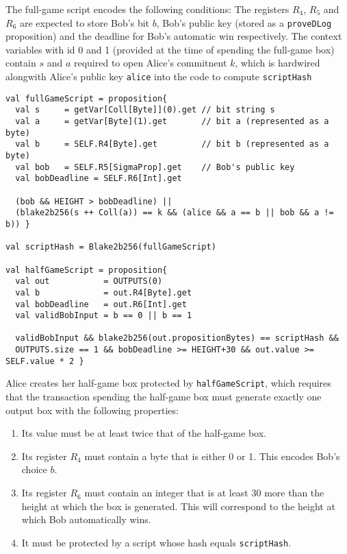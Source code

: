 \documentclass[11pt]{article}
\newcommand{\langname}{ErgoScript\xspace}
\begin{document}
The full-game script encodes the following conditions: The registers $R_4$, $R_5$ and $R_6$ are expected to store Bob's bit $b$, Bob's public key (stored as a \texttt{proveDLog} proposition) and the deadline for Bob's automatic win respectively. The context variables with id 0 and 1 (provided at the time of spending the full-game box) contain $s$ and $a$ required to open Alice's commitnent $k$, which is hardwired alongwith Alice's public key \texttt{alice} into the code to compute \texttt{scriptHash} 

\begin{verbatim}
val fullGameScript = proposition{
  val s     = getVar[Coll[Byte]](0).get // bit string s
  val a     = getVar[Byte](1).get       // bit a (represented as a byte)
  val b     = SELF.R4[Byte].get         // bit b (represented as a byte)
  val bob   = SELF.R5[SigmaProp].get    // Bob's public key
  val bobDeadline = SELF.R6[Int].get
   
  (bob && HEIGHT > bobDeadline) || 
  (blake2b256(s ++ Coll(a)) == k && (alice && a == b || bob && a != b)) } 

val scriptHash = Blake2b256(fullGameScript)

val halfGameScript = proposition{
  val out           = OUTPUTS(0)
  val b             = out.R4[Byte].get
  val bobDeadline   = out.R6[Int].get
  val validBobInput = b == 0 || b == 1

  validBobInput && blake2b256(out.propositionBytes) == scriptHash &&
  OUTPUTS.size == 1 && bobDeadline >= HEIGHT+30 && out.value >= SELF.value * 2 }
\end{verbatim}

Alice creates her half-game box protected by \texttt{halfGameScript}, which requires that the transaction spending the half-game box must generate exactly one output box with the following properties:

\begin{enumerate}
	\item Its value must be at least twice that of the half-game box.
	\item Its register $R_4$ must contain a byte that is either 0 or 1. This encodes Bob's choice $b$.
	\item Its register $R_6$ must contain an integer that is at least 30 more than the height at which the box is generated. This will correspond to the height at which Bob automatically wins.
	\item It must be protected by a script whose hash equals \texttt{scriptHash}.
\end{enumerate}
 
\end{document}
